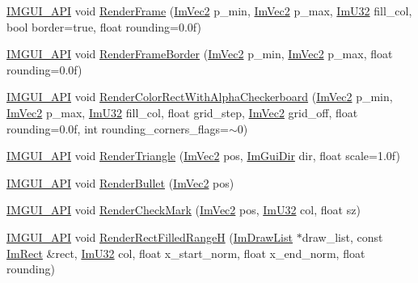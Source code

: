 \begin{DoxyCompactItemize}
\item 
\mbox{\hyperlink{imgui_8h_a43829975e84e45d1149597467a14bbf5}{I\+M\+G\+U\+I\+\_\+\+A\+PI}} void \mbox{\hyperlink{namespace_im_gui_a621ba649568ede3939d4f10d83b86d04}{Render\+Frame}} (\mbox{\hyperlink{struct_im_vec2}{Im\+Vec2}} p\+\_\+min, \mbox{\hyperlink{struct_im_vec2}{Im\+Vec2}} p\+\_\+max, \mbox{\hyperlink{imgui_8h_a118cff4eeb8d00e7d07ce3d6460eed36}{Im\+U32}} fill\+\_\+col, bool border=true, float rounding=0.\+0f)
\item 
\mbox{\hyperlink{imgui_8h_a43829975e84e45d1149597467a14bbf5}{I\+M\+G\+U\+I\+\_\+\+A\+PI}} void \mbox{\hyperlink{namespace_im_gui_adc76239c2006e66f8dab7638529a763d}{Render\+Frame\+Border}} (\mbox{\hyperlink{struct_im_vec2}{Im\+Vec2}} p\+\_\+min, \mbox{\hyperlink{struct_im_vec2}{Im\+Vec2}} p\+\_\+max, float rounding=0.\+0f)
\item 
\mbox{\hyperlink{imgui_8h_a43829975e84e45d1149597467a14bbf5}{I\+M\+G\+U\+I\+\_\+\+A\+PI}} void \mbox{\hyperlink{namespace_im_gui_a4715686ee0c613e8518c0f5e92c358ce}{Render\+Color\+Rect\+With\+Alpha\+Checkerboard}} (\mbox{\hyperlink{struct_im_vec2}{Im\+Vec2}} p\+\_\+min, \mbox{\hyperlink{struct_im_vec2}{Im\+Vec2}} p\+\_\+max, \mbox{\hyperlink{imgui_8h_a118cff4eeb8d00e7d07ce3d6460eed36}{Im\+U32}} fill\+\_\+col, float grid\+\_\+step, \mbox{\hyperlink{struct_im_vec2}{Im\+Vec2}} grid\+\_\+off, float rounding=0.\+0f, int rounding\+\_\+corners\+\_\+flags=$\sim$0)
\item 
\mbox{\hyperlink{imgui_8h_a43829975e84e45d1149597467a14bbf5}{I\+M\+G\+U\+I\+\_\+\+A\+PI}} void \mbox{\hyperlink{namespace_im_gui_ad11a82904a65722d285230567af826b8}{Render\+Triangle}} (\mbox{\hyperlink{struct_im_vec2}{Im\+Vec2}} pos, \mbox{\hyperlink{imgui__internal_8h_a4b8427c5153ae1d43278dc397d809335}{Im\+Gui\+Dir}} dir, float scale=1.\+0f)
\item 
\mbox{\hyperlink{imgui_8h_a43829975e84e45d1149597467a14bbf5}{I\+M\+G\+U\+I\+\_\+\+A\+PI}} void \mbox{\hyperlink{namespace_im_gui_a2d0e4160081b3953fc8f88e2d8e8da15}{Render\+Bullet}} (\mbox{\hyperlink{struct_im_vec2}{Im\+Vec2}} pos)
\item 
\mbox{\hyperlink{imgui_8h_a43829975e84e45d1149597467a14bbf5}{I\+M\+G\+U\+I\+\_\+\+A\+PI}} void \mbox{\hyperlink{namespace_im_gui_a6adfc430445ed42a65556ffb0d58a8b8}{Render\+Check\+Mark}} (\mbox{\hyperlink{struct_im_vec2}{Im\+Vec2}} pos, \mbox{\hyperlink{imgui_8h_a118cff4eeb8d00e7d07ce3d6460eed36}{Im\+U32}} col, float sz)
\item 
\mbox{\hyperlink{imgui_8h_a43829975e84e45d1149597467a14bbf5}{I\+M\+G\+U\+I\+\_\+\+A\+PI}} void \mbox{\hyperlink{namespace_im_gui_af311762331bda4508b25e05f6afc7f45}{Render\+Rect\+Filled\+RangeH}} (\mbox{\hyperlink{struct_im_draw_list}{Im\+Draw\+List}} $\ast$draw\+\_\+list, const \mbox{\hyperlink{struct_im_rect}{Im\+Rect}} \&rect, \mbox{\hyperlink{imgui_8h_a118cff4eeb8d00e7d07ce3d6460eed36}{Im\+U32}} col, float x\+\_\+start\+\_\+norm, float x\+\_\+end\+\_\+norm, float rounding)

\end{DoxyCompactItemize}
